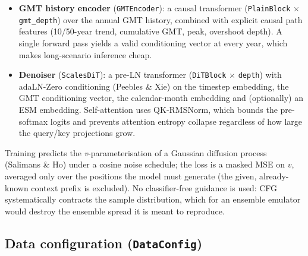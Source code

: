 \documentclass[11pt]{article}
\begin{document}
\begin{itemize}
  \item \textbf{GMT history encoder} (\texttt{GMTEncoder}): a causal
    transformer (\texttt{PlainBlock} $\times$ \texttt{gmt\_depth}) over the
    annual GMT history, combined with explicit causal path features
    (10/50-year trend, cumulative GMT, peak, overshoot depth). A single
    forward pass yields a valid conditioning vector at every year, which
    makes long-scenario inference cheap.
  \item \textbf{Denoiser} (\texttt{ScalesDiT}): a pre-LN transformer
    (\texttt{DiTBlock} $\times$ \texttt{depth}) with adaLN-Zero
    conditioning (Peebles \& Xie) on the timestep embedding, the GMT
    conditioning vector, the calendar-month embedding and (optionally) an
    ESM embedding. Self-attention uses QK-RMSNorm, which bounds the
    pre-softmax logits and prevents attention entropy collapse regardless
    of how large the query/key projections grow.
\end{itemize}

Training predicts the \emph{v}-parameterisation of a Gaussian diffusion
process (Salimans \& Ho) under a cosine noise schedule; the loss is a
masked MSE on $v$, averaged only over the positions the model must
generate (the given, already-known context prefix is excluded). No
classifier-free guidance is used: CFG systematically contracts the sample
distribution, which for an ensemble emulator would destroy the ensemble
spread it is meant to reproduce.

\subsection{Data configuration (\texttt{DataConfig})}
\end{document}
